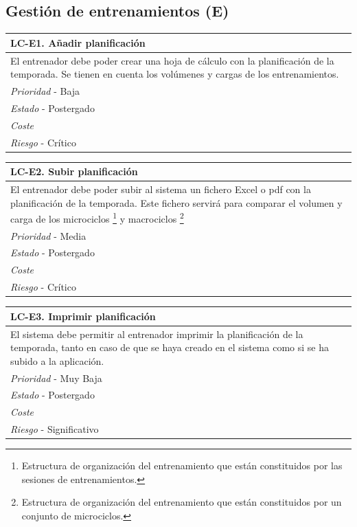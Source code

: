 
%
%
\subsection{Gestión de entrenamientos (E)} %
	\label{sub:gestion_de_entrenamientos}

	\begin{center}
		\begin{tabularx}{15cm}{|X|}
			\hline 
				\bf{LC-E1. Añadir planificación}\\
			\hline
				El entrenador debe poder crear una hoja de cálculo con la planificación de la temporada. Se tienen en cuenta los volúmenes y cargas de los entrenamientos.\\
			\hline
				{\it Prioridad} - Baja\\
			\hline
				{\it Estado} - Postergado\\
			\hline
				{\it Coste}\\
			\hline
				{\it Riesgo} - Crítico\\
			\hline
		\end{tabularx}
	\end{center}
	
	\begin{center}
		\begin{tabularx}{15cm}{|X|}
			\hline 
				\bf{LC-E2. Subir planificación}\\
			\hline
				El entrenador debe poder subir al sistema un fichero Excel o pdf con la planificación de la temporada. Este fichero servirá para comparar el volumen y carga de los microciclos \footnote{Estructura de organización del entrenamiento que están constituidos por las sesiones de entrenamientos.} y macrociclos \footnote{Estructura de organización del entrenamiento que están constituidos por un conjunto de microciclos.}\\
			\hline
				{\it Prioridad} - Media\\
			\hline
				{\it Estado} - Postergado\\
			\hline
				{\it Coste}\\
			\hline
				{\it Riesgo} - Crítico\\
			\hline
		\end{tabularx}
	\end{center}
	
	\begin{center}
		\begin{tabularx}{15cm}{|X|}
			\hline 
				\bf{LC-E3. Imprimir planificación}\\
			\hline
				El sistema debe permitir al entrenador imprimir la planificación de la temporada, tanto en caso de que se haya creado en el sistema como si se ha subido a la aplicación.\\
			\hline
				{\it Prioridad} - Muy Baja\\
			\hline
				{\it Estado} - Postergado\\
			\hline
				{\it Coste}\\
			\hline
				{\it Riesgo} - Significativo\\
			\hline
		\end{tabularx}
	\end{center}
	
